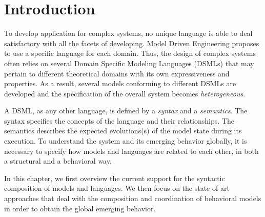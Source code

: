 \section{Introduction}
To develop application for complex systems, no unique language is able to deal satisfactory with all the facets of developing. Model Driven Engineering proposes to use a specific language for each domain. Thus, the design of complex systems often relies on several Domain Specific Modeling Languages (DSMLs) that may pertain to different theoretical domains with its own expressiveness and properties. As a result, several models conforming to different DSMLs are developed and the specification of the overall system becomes \emph{heterogeneous}. 
	
A DSML, as any other language, is defined by a \emph{syntax} and a \emph{semantics}. The syntax specifies the concepts of the language and their relationships. The semantics describes the expected evolutions(s) of the model state during its execution. To understand the system and its emerging behavior globally, it is necessary to specify how models and languages are related to each other, in both a structural and a behavioral way. 
	
In this chapter, we first overview the current support for the syntactic composition of models and languages. We then focus on the state of art approaches that deal with the composition and coordination of behavioral models in order to obtain the global emerging behavior.  
